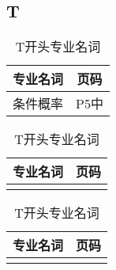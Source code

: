 \documentclass{wx672article}
\begin{document}
\begin{center}
  \section*{T}
\end{center}
\label{sec:t}


 \begin{table}[h!] %
      \centering
        \begin{tabular}[t]{c|c} %
          \hline
          专业名词 &  页码   \\
          \hline
          条件概率 & P5中 \\
          \hline
        \end{tabular}
        \hfill
        \begin{tabular}[t]{c|c}
          \hline
          专业名词  &  页码  \\
          \hline
           &  \\
          \hline
        \end{tabular}
        \hfill
        \begin{tabular}[t]{c|c}
          \hline
          专业名词 &  页码 \\
          \hline
           &  \\
          \hline
        \end{tabular}
        \caption{T开头专业名词}\label{tabT}
      \end{table}

      
\end{document}
